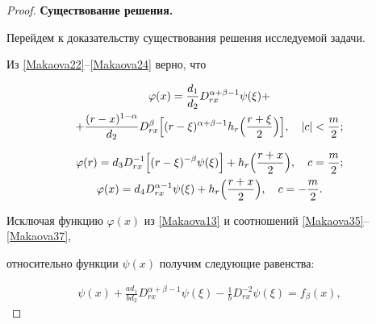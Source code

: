 \begin{proof}
\smallskip



{\bf Существование решения.} 

Перейдем к доказательству существования решения исследуемой задачи.

Из \eqref{Makaova22}--\eqref{Makaova24} верно, что

 \begin{multline}

\label{Makaova35} 

\varphi(x)=\frac{d_1}{d_2}

D_{rx}^{\alpha+\beta-1}\psi(\xi)+ \\ 

+

\frac{(r-x)^{1-\alpha}}{d_2}

D_{rx}^\beta

\Bigl[(r- \xi)^{\alpha+\beta-1} h_r \Bigl(\frac{r+\xi}{2} \Bigr)

\Bigr], \quad  |c|<\frac{m}{2};

\end{multline}



\begin{gather}

\label{Makaova37} 

\varphi(r)=d_3D_{rx}^{-1} 

\Bigl[

(r-\xi)^{-\beta}\psi(\xi)\Bigr]+h_r\Bigl(\frac{r+x}{2} \Bigr)

,

\quad  c=\frac{m}{2};

\\

\label{Makaova37} 

\varphi(x)=d_4D_{rx}^{\alpha-1}\psi(\xi)+

h_r\Bigl(\frac{r+x}{2} \Bigr), \quad  c=-\frac{m}{2}.

\end{gather}

Исключая функцию $\varphi(x)$ из \eqref{Makaova13} и соотношений \eqref{Makaova35}--\eqref{Makaova37}, 

относительно  функции $\psi(x)$ получим следующие равенства:

 \begin{gather}

\label{Makaova38} 

\psi(x)+\frac{ad_1}{bd_2}D^{\alpha+\beta-1}_{rx}\psi(\xi)-\frac{1}{b}D^{-2}_{rx}\psi(\xi)=f_\beta(x), 


\end{gather}
\end{proof}
